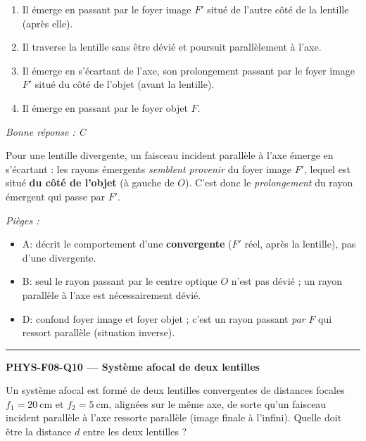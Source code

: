 \documentclass[11pt,a4paper]{article}
\begin{document}
\begin{enumerate}[label=\Alph*)]
\item Il émerge en passant par le foyer image $F'$ situé de l'autre côté de la lentille (après elle).
\item Il traverse la lentille sans être dévié et poursuit parallèlement à l'axe.
\item Il émerge en s'écartant de l'axe, son prolongement passant par le foyer image $F'$ situé du côté de l'objet (avant la lentille).
\item Il émerge en passant par le foyer objet $F$.
\end{enumerate}
\textit{Bonne réponse : C}\par
Pour une lentille divergente, un faisceau incident parallèle à l'axe émerge en s'écartant : les rayons
émergents \emph{semblent provenir} du foyer image $F'$, lequel est situé \textbf{du côté de l'objet}
(à gauche de $O$). C'est donc le \emph{prolongement} du rayon émergent qui passe par $F'$.\par
\textit{Pièges :}
\begin{itemize}
\item A: décrit le comportement d'une \textbf{convergente} ($F'$ réel, après la lentille), pas d'une divergente.
\item B: seul le rayon passant par le centre optique $O$ n'est pas dévié ; un rayon parallèle à l'axe est nécessairement dévié.
\item D: confond foyer image et foyer objet ; c'est un rayon passant \emph{par} $F$ qui ressort parallèle (situation inverse).
\end{itemize}
\vspace{8pt}\hrule\vspace{8pt}

\noindent\textbf{PHYS-F08-Q10 --- Système afocal de deux lentilles}\par
Un système afocal est formé de deux lentilles convergentes de distances focales $f_1=\qty{20}{\centi\metre}$ et
$f_2=\qty{5}{\centi\metre}$, alignées sur le même axe, de sorte qu'un faisceau incident parallèle à l'axe
ressorte parallèle (image finale à l'infini). Quelle doit être la distance $d$ entre les deux lentilles ?

\begin{center}
\end{center}
\end{document}
